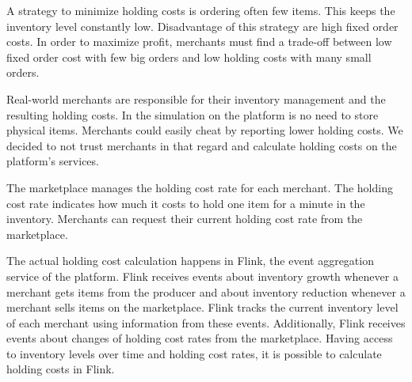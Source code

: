 A strategy to minimize holding costs is ordering often few items.
This keeps the inventory level constantly low.
Disadvantage of this strategy are high fixed order costs.
In order to maximize profit, merchants must find a trade-off between low fixed order cost with few big orders and low holding costs with many small orders.

Real-world merchants are responsible for their inventory management and the resulting holding costs.
In the simulation on the \pricewars platform is no need to store physical items.
Merchants could easily cheat by reporting lower holding costs.
We decided to not trust merchants in that regard and calculate holding costs on the platform's services.

The marketplace manages the holding cost rate for each merchant.
The holding cost rate indicates how much it costs to hold one item for a minute in the inventory.
Merchants can request their current holding cost rate from the marketplace.

The actual holding cost calculation happens in Flink, the event aggregation service of the \pricewars platform.
Flink receives events about inventory growth whenever a merchant gets items from the producer and about inventory reduction whenever a merchant sells items on the marketplace.
Flink tracks the current inventory level of each merchant using information from these events.
Additionally, Flink receives events about changes of holding cost rates from the marketplace.
Having access to inventory levels over time and holding cost rates, it is possible to calculate holding costs in Flink.

